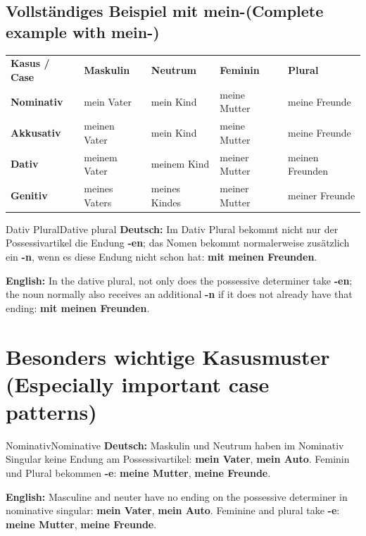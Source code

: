 \documentclass[a4paper,11pt]{article}
\newcommand{\GermanText}[1]{\textbf{Deutsch: }#1\par}
\newcommand{\EnglishText}[1]{{\small\color{SoftGray}\textbf{English: }#1\par}}
\begin{document}
\subsection{Vollständiges Beispiel mit \glqq mein-\grqq \textnormal{(Complete example with \glqq mein-\grqq)}}

\begin{longtable}{>{\bfseries}p{2.5cm}|p{3.0cm}|p{3.0cm}|p{3.0cm}|p{3.2cm}}
\rowcolor{HeaderBlueDark}
\color{white}\textbf{Kasus / Case} &
\color{white}\textbf{Maskulin} &
\color{white}\textbf{Neutrum} &
\color{white}\textbf{Feminin} &
\color{white}\textbf{Plural} \\
Nominativ & mein Vater & mein Kind & meine Mutter & meine Freunde \\
Akkusativ & meinen Vater & mein Kind & meine Mutter & meine Freunde \\
Dativ & meinem Vater & meinem Kind & meiner Mutter & meinen Freunden \\
Genitiv & meines Vaters & meines Kindes & meiner Mutter & meiner Freunde \\
\end{longtable}

\begin{grammarentry}{Dativ Plural}{Dative plural}
\GermanText{Im Dativ Plural bekommt nicht nur der Possessivartikel die Endung \textbf{-en}; das Nomen bekommt normalerweise zusätzlich ein \textbf{-n}, wenn es diese Endung nicht schon hat: \textbf{mit meinen Freunden}.}
\EnglishText{In the dative plural, not only does the possessive determiner take \textbf{-en}; the noun normally also receives an additional \textbf{-n} if it does not already have that ending: \textbf{mit meinen Freunden}.}
\end{grammarentry}

\section{Besonders wichtige Kasusmuster \textnormal{(Especially important case patterns)}}

\begin{grammarentry}{Nominativ}{Nominative}
\GermanText{Maskulin und Neutrum haben im Nominativ Singular keine Endung am Possessivartikel: \textbf{mein Vater}, \textbf{mein Auto}. Feminin und Plural bekommen \textbf{-e}: \textbf{meine Mutter}, \textbf{meine Freunde}.}
\EnglishText{Masculine and neuter have no ending on the possessive determiner in nominative singular: \textbf{mein Vater}, \textbf{mein Auto}. Feminine and plural take \textbf{-e}: \textbf{meine Mutter}, \textbf{meine Freunde}.}
\end{grammarentry}
\end{document}
